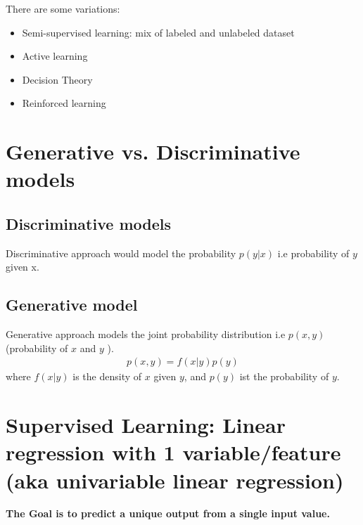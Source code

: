 \documentclass[a4paper,12pt]{report}
\begin{document}
There are some variations:
\begin{itemize}
\item Semi-supervised learning: mix of labeled and unlabeled dataset
\item Active learning
\item Decision Theory
\item Reinforced learning
\end{itemize}
\section{Generative vs. Discriminative models}
\subsection{Discriminative models}
Discriminative approach would model the probability $p(y|x)$ i.e probability of $y$ given x.

\subsection{Generative model}
Generative approach models the joint probability distribution i.e $p(x, y)$ (probability of $x$ and $y$ ).
\newline
\begin{align}
p(x,y) = f(x|y) p(y)
\end{align}
where $f(x|y)$ is the density of $x$ given $y$, and $p(y)$ ist the probability of $y$.
\section{Supervised Learning: Linear regression with 1 variable/feature (aka univariable linear regression)}
\textbf{The Goal is to predict a unique output from a single input value.}
\end{document}
